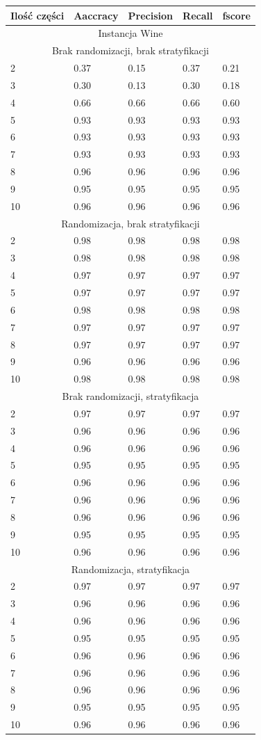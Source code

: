 \documentclass[12pt,a4paper]{article}
\begin{document}
\begin{tabular}{ |p{2.3cm}||p{2.5cm}|p{2.5cm}|p{2.5cm}|p{2.5cm}| }
 \hline
 Ilość części & Aaccracy & Precision & Recall & fscore\\
 \hline
\hline
\multicolumn{5}{|c|}{Instancja Wine}\\
\hline
\hline
\multicolumn{5}{|c|}{Brak randomizacji, brak stratyfikacji}\\
\hline
2&0.37& 0.15& 0.37& 0.21\\
3&0.30& 0.13& 0.30& 0.18\\
4&0.66& 0.66& 0.66& 0.60\\
5&0.93& 0.93& 0.93& 0.93\\
6&0.93& 0.93& 0.93& 0.93\\
7&0.93& 0.93& 0.93& 0.93\\
8&0.96& 0.96& 0.96& 0.96\\
9&0.95& 0.95& 0.95& 0.95\\
10&0.96& 0.96& 0.96& 0.96\\
\hline
\multicolumn{5}{|c|}{Randomizacja, brak stratyfikacji}\\
\hline
2&0.98& 0.98& 0.98& 0.98\\
3&0.98& 0.98& 0.98& 0.98\\
4&0.97& 0.97& 0.97& 0.97\\
5&0.97& 0.97& 0.97& 0.97\\
6&0.98& 0.98& 0.98& 0.98\\
7&0.97& 0.97& 0.97& 0.97\\
8&0.97& 0.97& 0.97& 0.97\\
9&0.96& 0.96& 0.96& 0.96\\
10&0.98& 0.98& 0.98& 0.98\\
\hline
\multicolumn{5}{|c|}{Brak randomizacji, stratyfikacja}\\
\hline
2&0.97& 0.97& 0.97& 0.97\\
3&0.96& 0.96& 0.96& 0.96\\
4&0.96& 0.96& 0.96& 0.96\\
5&0.95& 0.95& 0.95& 0.95\\
6&0.96& 0.96& 0.96& 0.96\\
7&0.96& 0.96& 0.96& 0.96\\
8&0.96& 0.96& 0.96& 0.96\\
9&0.95& 0.95& 0.95& 0.95\\
10&0.96& 0.96& 0.96& 0.96\\
\hline
\multicolumn{5}{|c|}{Randomizacja, stratyfikacja}\\
\hline
2&0.97& 0.97& 0.97& 0.97\\
3&0.96& 0.96& 0.96& 0.96\\
4&0.96& 0.96& 0.96& 0.96\\
5&0.95& 0.95& 0.95& 0.95\\
6&0.96& 0.96& 0.96& 0.96\\
7&0.96& 0.96& 0.96& 0.96\\
8&0.96& 0.96& 0.96& 0.96\\
9&0.95& 0.95& 0.95& 0.95\\
10&0.96& 0.96& 0.96& 0.96\\
\hline
\end{tabular}
\end{document}
